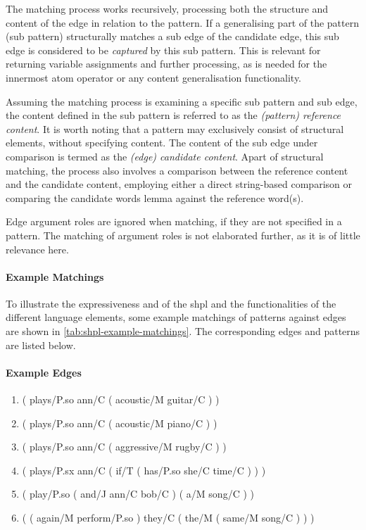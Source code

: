 \documentclass[11pt, numbers=noenddot]{scrreprt}
\begin{document}
The matching process works recursively, processing both the structure and content of the edge in relation to the pattern. If a generalising part of the pattern (sub pattern) structurally matches a sub edge of the candidate edge, this sub edge is considered to be \textit{captured} by this sub pattern. This is relevant for returning variable assignments and further processing, as is needed for the innermost atom operator or any content generalisation functionality.

Assuming the matching process is examining a specific sub pattern and sub edge, the content defined in the sub pattern is referred to as the \textit{(pattern) reference content}. It is worth noting that a pattern may exclusively consist of structural elements, without specifying content. The content of the sub edge under comparison is termed as the \textit{(edge) candidate content}. Apart of structural matching, the process also involves a comparison between the reference content and the candidate content, employing either a direct string-based comparison or comparing the candidate words lemma against the reference word(s).

Edge argument roles are ignored when matching, if they are not specified in a pattern. The matching of argument roles is not elaborated further, as it is of little relevance here.


\paragraph{Example Matchings} To illustrate the expressiveness and of the \gls{shpl} and the
functionalities of the different language elements, some example matchings of patterns against edges are shown in \cref{tab:shpl-example-matchings}. The corresponding edges and patterns are listed below.

\paragraph{Example Edges}
\begin{enumerate}[label={$e_{\arabic*}$ = }]
	\item \textsf{( plays/P.so ann/C ( acoustic/M guitar/C ) )}
	\item \textsf{( plays/P.so ann/C ( acoustic/M piano/C ) )}
	\item \textsf{( plays/P.so ann/C ( aggressive/M rugby/C ) )}
	\item \textsf{( plays/P.sx ann/C ( if/T ( has/P.so she/C time/C ) ) )}
	\item \textsf{( play/P.so ( and/J ann/C bob/C ) ( a/M song/C ) )}
	\item \textsf{( ( again/M perform/P.so ) they/C ( the/M ( same/M song/C ) ) )}
\end{enumerate}
\end{document}
